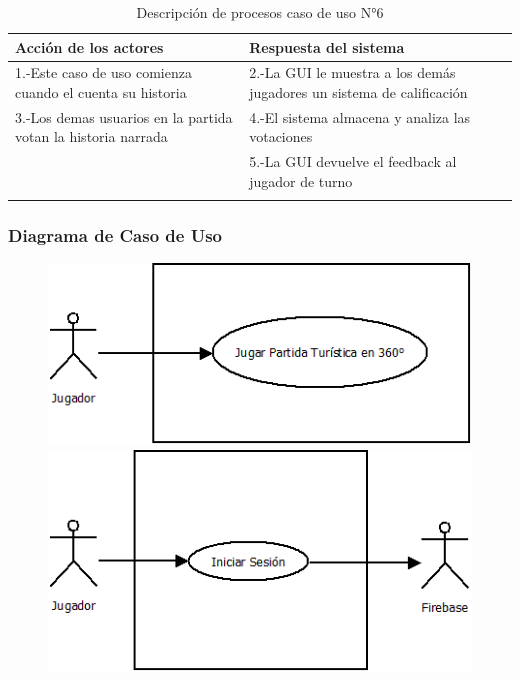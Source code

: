 \begin{longtable}[H]{| m{8cm} | m{8cm} |}
\hline 
\textbf{Acción de los actores} & \textbf{Respuesta del sistema}\\
\hline 
1.-Este caso de uso comienza cuando el cuenta su historia & 2.-La GUI le muestra a los demás jugadores un sistema de calificación\\
\hline
3.-Los demas usuarios en la partida votan la historia narrada & 4.-El sistema almacena y analiza las votaciones\\
\hline
& 5.-La GUI devuelve el feedback al jugador de turno\\
\hline
\caption{Descripción de procesos caso de uso N°6}
\end{longtable}

\subsubsection{Diagrama de Caso de Uso}
\begin{figure}[H]
   \includegraphics[scale=0.5]{imgs/DiagramaCasoUso1.png}
   \includegraphics[scale=0.5]{imgs/DiagramaCasoUso2.png}
\end{figure}

